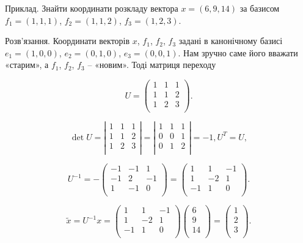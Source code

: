 Приклад. Знайти координати розкладу вектора $x = (6, 9,14)$ за базисом
$f_1 = (1,1,1)$, $f_2 = (1,1, 2)$, $f_3 = (1, 2, 3)$.

Розв’язання. Координати векторів $x$, $f_1$, $f_2$, $f_3$ задані в канонічному
базисі $e_1 = (1, 0, 0)$, $e_2 = (0,1, 0)$, $e_3 = (0, 0,1)$. Нам зручно саме його вважати
«старим», а $f_1$, $f_2$, $f_3$ -- «новим». Тоді матриця переходу

$$U = \begin{pmatrix}
	1 & 1 & 1 \\
	1 & 1 & 2 \\
	1 & 2 & 3 \\
\end{pmatrix}.$$

$$\det U = \left| \begin{matrix}
	1 & 1 & 1 \\
	1 & 1 & 2 \\
	1 & 2 & 3 \\
\end{matrix} \right| = \left| \begin{matrix}
	1 & 1 & 1 \\
	0 & 0 & 1 \\
	0 & 1 & 2 \\
\end{matrix} \right| = -1, U^T = U,$$

$$U^{-1} = -\begin{pmatrix}
	-1 & -1 &  1 \\
	-1 &  2 & -1 \\
	 1 & -1 &  0 \\
\end{pmatrix} = \begin{pmatrix}
	 1 &  1 & -1 \\
	 1 & -2 &  1 \\
	-1 &  1 &  0 \\
\end{pmatrix}.$$

$$\tilde{x} = U^{-1} x = \begin{pmatrix}
	 1 &  1 & -1 \\
	 1 & -2 &  1 \\
	-1 &  1 &  0 \\
\end{pmatrix} \begin{pmatrix}
	 6 \\
	 9 \\
	14 \\
\end{pmatrix} = \begin{pmatrix}
	1 \\
	2 \\
	3 \\
\end{pmatrix}.$$

